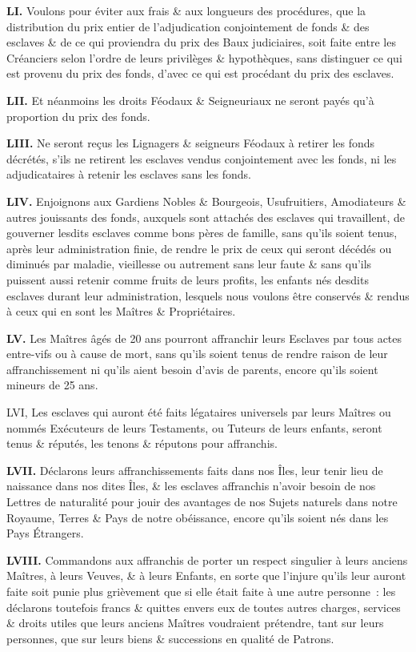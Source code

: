 \documentclass[twoside]{book} %
\newcommand{\labelchar}[1]{\textbf{\color{rubric} #1}}
\begin{document}
\labelchar{LI.} Voulons pour éviter aux frais \& aux longueurs des procédures, que la distribution du prix entier de l’adjudication conjointement de fonds \& des esclaves \& de ce qui proviendra du prix des Baux judiciaires, soit faite entre les Créanciers selon l’ordre de leurs privilèges \& hypothèques, sans distinguer ce qui est provenu du prix des fonds, d’avec ce qui est procédant du prix des esclaves.\par
\labelchar{LII.} Et néanmoins les droits Féodaux \& Seigneuriaux ne seront payés qu’à proportion du prix des fonds.\par
\labelchar{LIII.} Ne seront reçus les Lignagers \& seigneurs Féodaux à retirer les fonds décrétés, s’ils ne retirent les esclaves vendus conjointement avec les fonds, ni les adjudicataires à retenir les esclaves sans les fonds.\par
\labelchar{LIV.} Enjoignons aux Gardiens Nobles \& Bourgeois, Usufruitiers, Amodiateurs \& autres jouissants des fonds, auxquels sont attachés des esclaves qui travaillent, de gouverner lesdits esclaves comme bons pères de famille, sans qu’ils soient tenus, après leur administration finie, de rendre le prix de ceux qui seront décédés ou diminués par maladie, vieillesse ou autrement sans leur faute \& sans qu’ils puissent aussi retenir comme fruits de leurs profits, les enfants nés desdits esclaves durant leur administration, lesquels nous voulons être conservés \& rendus à ceux qui en sont les Maîtres \& Propriétaires.\par
\labelchar{LV.} Les Maîtres âgés de 20 ans pourront affranchir leurs Esclaves par tous actes entre-vifs ou à cause de mort, sans qu’ils soient tenus de rendre raison de leur affranchissement ni qu’ils aient besoin d’avis de parents, encore qu’ils soient mineurs de 25 ans.\par
LVI, Les esclaves qui auront été faits légataires universels par leurs Maîtres ou nommés Exécuteurs de leurs Testaments, ou Tuteurs de leurs enfants, seront tenus \& réputés, les tenons \& réputons pour affranchis.\par
\labelchar{LVII.} Déclarons leurs affranchissements faits dans nos Îles, leur tenir lieu de naissance dans nos dites Îles, \& les esclaves affranchis n’avoir besoin de nos Lettres de naturalité pour jouir des avantages de nos Sujets naturels dans notre Royaume, Terres \& Pays de notre obéissance, encore qu’ils soient nés dans les Pays Étrangers.\par
\labelchar{LVIII.} Commandons aux affranchis de porter un respect singulier à leurs anciens Maîtres, à leurs Veuves, \& à leurs Enfants, en sorte que l’injure qu’ils leur auront faite soit punie plus grièvement que si elle était faite à une autre personne : les déclarons toutefois francs \& quittes envers eux de toutes autres charges, services \& droits utiles que leurs anciens Maîtres voudraient prétendre, tant sur leurs personnes, que sur leurs biens \& successions en qualité de Patrons.\par
\end{document}
